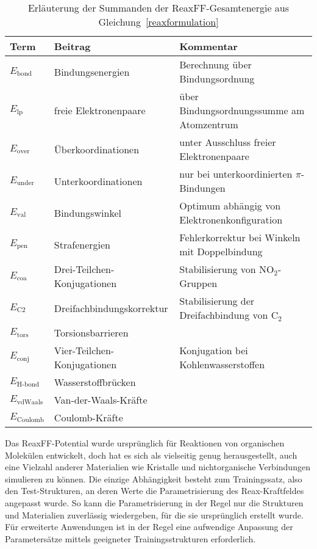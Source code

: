 \begin{table}
  \oddrowcolors
  \caption[Summanden der ReaxFF-Gesamtenergie]{
    Erläuterung der Summanden der ReaxFF-Gesamtenergie aus Gleichung~\ref{reaxformulation}\cite{van_duin_reaxff:_2001}
  }
  \label{tab:reaxenergies}
  \begin{tabularx}{\textwidth}{|llX|}
    \hline
    \textbf{Term}      & \textbf{Beitrag}            & \textbf{Kommentar}                            \\
    \hline
    $E_\text{bond}$    & Bindungsenergien            & Berechnung über Bindungsordnung               \\
    $E_\text{lp}$      & freie Elektronenpaare       & über Bindungsordnungssumme am Atomzentrum     \\
    $E_\text{over}$    & Überkoordinationen          & unter Ausschluss freier Elektronenpaare       \\
    $E_\text{under}$   & Unterkoordinationen         & nur bei unterkoordinierten $\pi$-Bindungen    \\
    $E_\text{val}$     & Bindungswinkel              & Optimum abhängig von Elektronenkonfiguration  \\
    $E_\text{pen}$     & Strafenergien               & Fehlerkorrektur bei Winkeln mit Doppelbindung \\
    $E_\text{coa}$     & Drei-Teilchen-Konjugationen & Stabilisierung von NO$_2$-Gruppen             \\
    $E_\text{C2}$      & Dreifachbindungskorrektur   & Stabilisierung der Dreifachbindung von C$_2$  \\
    $E_\text{tors}$    & Torsionsbarrieren           &                                               \\
    $E_\text{conj}$    & Vier-Teilchen-Konjugationen & Konjugation bei Kohlenwasserstoffen           \\
    $E_\text{H-bond}$  & Wasserstoffbrücken          &                                               \\
    $E_\text{vdWaals}$ & Van-der-Waals-Kräfte        &                                               \\
    $E_\text{Coulomb}$ & Coulomb-Kräfte              &                                               \\
    \hline
  \end{tabularx}
\end{table}

Das ReaxFF-Potential wurde ursprünglich für Reaktionen von organischen Molekülen entwickelt\cite{van_duin_reaxff:_2001}, doch hat es sich als vielseitig genug herausgestellt, auch eine Vielzahl anderer Materialien wie Kristalle und nichtorganische Verbindungen simulieren zu können\cite{kulkarni_oxygen_2013,narayanan_reactive_2012,zhang_carbon_2009}.
Die einzige Abhängigkeit besteht zum Trainingssatz, also den Test-Strukturen, an deren Werte die Parametrisierung des Reax-Kraftfeldes angepasst wurde.
So kann die Parametrisierung in der Regel nur die Strukturen und Materialien zuverlässig wiedergeben, für die sie ursprünglich erstellt wurde.
Für erweiterte Anwendungen ist in der Regel eine aufwendige Anpassung der Parametersätze mittels geeigneter Trainingsstrukturen erforderlich.

